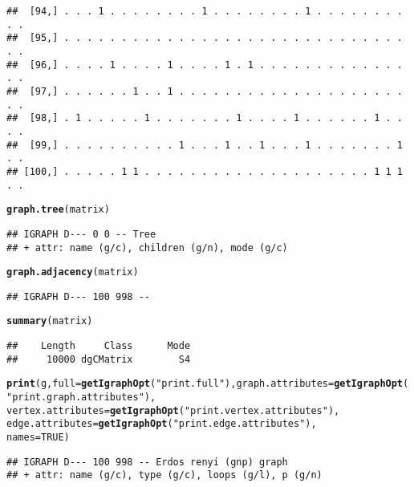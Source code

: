 \documentclass{article}\usepackage[]{graphicx}\usepackage[]{color}
\makeatletter
\newcommand{\hlnum}[1]{\textcolor[rgb]{0.686,0.059,0.569}{#1}}%
\newcommand{\hlstr}[1]{\textcolor[rgb]{0.192,0.494,0.8}{#1}}%
\newcommand{\hlstd}[1]{\textcolor[rgb]{0.345,0.345,0.345}{#1}}%
\newcommand{\hlkwc}[1]{\textcolor[rgb]{0.333,0.667,0.333}{#1}}%
\newcommand{\hlkwd}[1]{\textcolor[rgb]{0.737,0.353,0.396}{\textbf{#1}}}%
\newenvironment{kframe}{%
 \def\at@end@of@kframe{}%
 \ifinner\ifhmode%
  \def\at@end@of@kframe{\end{minipage}}%
  \begin{minipage}{\columnwidth}%
 \fi\fi%
 \def\FrameCommand##1{\hskip\@totalleftmargin \hskip-\fboxsep
 \colorbox{shadecolor}{##1}\hskip-\fboxsep
     \hskip-\linewidth \hskip-\@totalleftmargin \hskip\columnwidth}%
 \MakeFramed {\advance\hsize-\width
   \@totalleftmargin\z@ \linewidth\hsize
   \@setminipage}}%
 {\par\unskip\endMakeFramed%
 \at@end@of@kframe}
\newenvironment{knitrout}{}{} %
\makeatother
\begin{document}
\begin{knitrout}
\begin{kframe}
\begin{verbatim}
##  [94,] . . . 1 . . . . . . . . 1 . . . . . . . . 1 . . . . . . . . . .
##  [95,] . . . . . . . . . . . . . . . . . . . . . . . . . . . . . . . .
##  [96,] . . . . 1 . . . . 1 . . . . 1 . 1 . . . . . . . . . . . . . . .
##  [97,] . . . . . . 1 . . 1 . . . . . . . . . . . . . . . . . . . . . .
##  [98,] . 1 . . . . . 1 . . . . . . . 1 . . . . 1 . . . . . . 1 . . . .
##  [99,] . . . . . . . . . . 1 . . . 1 . . 1 . . . 1 . . . . . . . 1 . .
## [100,] . . . . . 1 1 . . . . . . . . . . . . . . . . . . . . 1 1 1 . .
\end{verbatim}
\begin{alltt}
\hlkwd{graph.tree}\hlstd{(matrix)}
\end{alltt}
\begin{verbatim}
## IGRAPH D--- 0 0 -- Tree
## + attr: name (g/c), children (g/n), mode (g/c)
\end{verbatim}
\begin{alltt}
\hlkwd{graph.adjacency}\hlstd{(matrix)}
\end{alltt}
\begin{verbatim}
## IGRAPH D--- 100 998 --
\end{verbatim}
\begin{alltt}
\hlkwd{summary}\hlstd{(matrix)}
\end{alltt}
\begin{verbatim}
##    Length     Class      Mode 
##     10000 dgCMatrix        S4
\end{verbatim}
\begin{alltt}
\hlkwd{print}\hlstd{(g,} \hlkwc{full} \hlstd{=} \hlkwd{getIgraphOpt}\hlstd{(}\hlstr{"print.full"}\hlstd{),} \hlkwc{graph.attributes} \hlstd{=} \hlkwd{getIgraphOpt}\hlstd{(}\hlstr{"print.graph.attributes"}\hlstd{),}
    \hlkwc{vertex.attributes} \hlstd{=} \hlkwd{getIgraphOpt}\hlstd{(}\hlstr{"print.vertex.attributes"}\hlstd{),}
    \hlkwc{edge.attributes} \hlstd{=} \hlkwd{getIgraphOpt}\hlstd{(}\hlstr{"print.edge.attributes"}\hlstd{),}
    \hlkwc{names} \hlstd{=} \hlnum{TRUE}\hlstd{)}
\end{alltt}
\begin{verbatim}
## IGRAPH D--- 100 998 -- Erdos renyi (gnp) graph
## + attr: name (g/c), type (g/c), loops (g/l), p (g/n)
\end{verbatim}
\end{kframe}
\end{knitrout}
\end{document}
